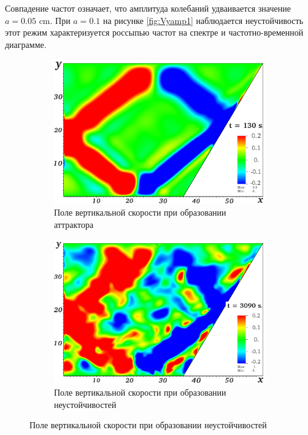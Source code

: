 Совпадение частот означает, что амплитуда колебаний удваивается значение $a=0.05$ cm. При $a=0.1$ на рисунке \ref{fig:Vyamp1} наблюдается неустойчивость этот режим характеризуется россыпью частот на спектре и частотно-временной диаграмме.

\begin{figure}
	\centering
	\begin{subfigure}[с]{0.45\textwidth}
	    \includegraphics[width=1\textwidth]{pics/H40L60N1ap10dp20w0p63/2DH40L60N1ap10dp20w0p63Vyn00012.png}
	    \caption{Поле вертикальной скорости при образовании аттрактора}
	\end{subfigure}
	\begin{subfigure}[с]{0.45\textwidth}
	    \includegraphics[width=1\textwidth]{pics/H40L60N1ap10dp20w0p63/2DH40L60N1ap10dp20w0p63Vyn00308.png}
	    \caption{Поле вертикальной скорости при образовании неустойчивостей}

\end{subfigure}
\end{figure}

